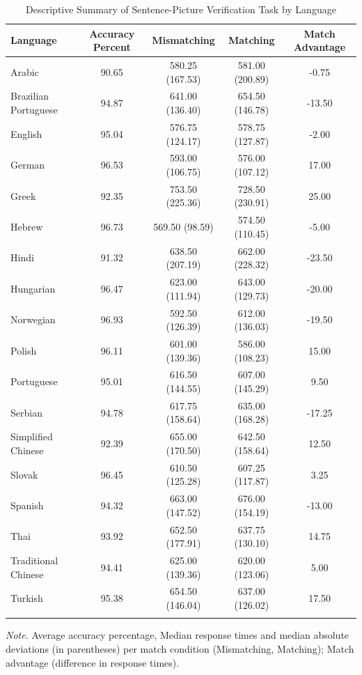 \documentclass[
  man,floatsintext]{apa7}
\begin{document}
\begin{table}[tbp]

\begin{center}
\begin{threeparttable}

\caption{\label{tab:summary-languages}Descriptive Summary of Sentence-Picture Verification Task by Language}

\begin{tabular}{lcccc}
\toprule
Language & Accuracy Percent & Mismatching & Matching & Match Advantage\\
\midrule
Arabic & 90.65 & 580.25 (167.53) & 581.00 (200.89) & -0.75\\
Brazilian Portuguese & 94.87 & 641.00 (136.40) & 654.50 (146.78) & -13.50\\
English & 95.04 & 576.75 (124.17) & 578.75 (127.87) & -2.00\\
German & 96.53 & 593.00 (106.75) & 576.00 (107.12) & 17.00\\
Greek & 92.35 & 753.50 (225.36) & 728.50 (230.91) & 25.00\\
Hebrew & 96.73 & 569.50 (98.59) & 574.50 (110.45) & -5.00\\
Hindi & 91.32 & 638.50 (207.19) & 662.00 (228.32) & -23.50\\
Hungarian & 96.47 & 623.00 (111.94) & 643.00 (129.73) & -20.00\\
Norwegian & 96.93 & 592.50 (126.39) & 612.00 (136.03) & -19.50\\
Polish & 96.11 & 601.00 (139.36) & 586.00 (108.23) & 15.00\\
Portuguese & 95.01 & 616.50 (144.55) & 607.00 (145.29) & 9.50\\
Serbian & 94.78 & 617.75 (158.64) & 635.00 (168.28) & -17.25\\
Simplified Chinese & 92.39 & 655.00 (170.50) & 642.50 (158.64) & 12.50\\
Slovak & 96.45 & 610.50 (125.28) & 607.25 (117.87) & 3.25\\
Spanish & 94.32 & 663.00 (147.52) & 676.00 (154.19) & -13.00\\
Thai & 93.92 & 652.50 (177.91) & 637.75 (130.10) & 14.75\\
Traditional Chinese & 94.41 & 625.00 (139.36) & 620.00 (123.06) & 5.00\\
Turkish & 95.38 & 654.50 (146.04) & 637.00 (126.02) & 17.50\\
\bottomrule
\addlinespace
\end{tabular}

\begin{tablenotes}[para]
\normalsize{\textit{Note.} Average accuracy percentage, Median response times and median absolute deviations (in parentheses) per match condition (Mismatching, Matching); Match advantage (difference in response times).}
\end{tablenotes}

\end{threeparttable}
\end{center}

\end{table}
\end{document}

